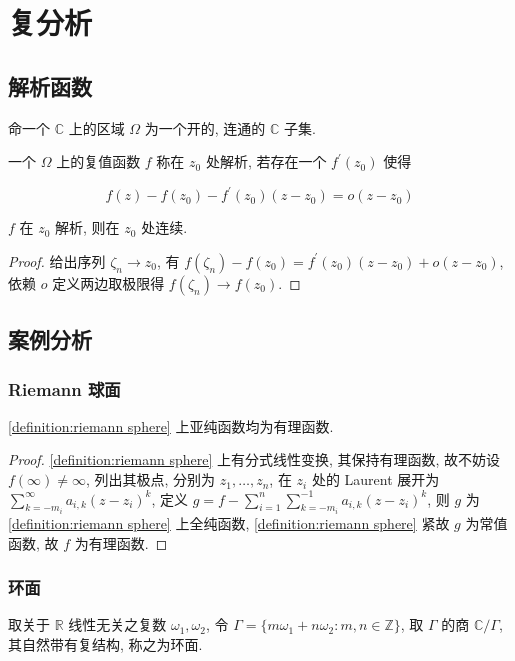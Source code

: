 \section{复分析}

\subsection{解析函数}

\begin{definition}[区域]
    命一个 \(\mathbb{C}\) 上的区域 \(\Omega\) 为一个开的, 连通的 \(\mathbb{C}\) 子集.
\end{definition}

\begin{definition}[解析]
    一个 \(\Omega\) 上的复值函数 \(f\) 称在 \(z_0\) 处解析, 若存在一个 \(f^\prime(z_0)\) 使得

    \[
        f(z) - f(z_0) - f^\prime(z_0)(z - z_0) = o(z - z_0)
    \]
\end{definition}

\begin{lemma}
    \(f\) 在 \(z_0\) 解析, 则在 \(z_0\) 处连续.

    \begin{proof}
        给出序列 \(\zeta_n \to z_0\), 有 \(f(\zeta_n) - f(z_0) = f^\prime(z_0)(z - z_0) + o(z - z_0)\), 
        依赖 \(o\) 定义两边取极限得 \(f(\zeta_n) \to f(z_0)\).
    \end{proof}
\end{lemma}

\begin{definition}[Riemann 球面]
    \label {definition:riemann sphere}
\end{definition}

\subsection{案例分析}

\subsubsection{Riemann 球面}

\begin{lemma}
    \ref{definition:riemann sphere} 上亚纯函数均为有理函数.

    \begin{proof}
        \ref{definition:riemann sphere} 上有分式线性变换, 其保持有理函数, 故不妨设 \(f(\infty) \neq \infty\),
        列出其极点, 分别为 \(z_1,\ldots,z_n\), 在 \(z_i\) 处的 Laurent 展开为 \(\sum_{k = -m_i}^\infty a_{i,k} (z - z_i)^k\),
        定义 \(g = f - \sum_{i = 1}^n \sum_{k = -m_i}^{-1} a_{i,k} (z - z_i)^k\), 则 \(g\) 为 \ref{definition:riemann sphere} 上全纯函数,
        \ref{definition:riemann sphere} 紧故 \(g\) 为常值函数, 故 \(f\) 为有理函数.
    \end{proof}
\end{lemma}

\subsubsection{环面}

\begin{definition}[环面]
    \label {definition:torus}
    取关于 \(\mathbb{R}\) 线性无关之复数 \(\omega_1,\omega_2\), 令 \(\Gamma = \{m \omega_1 + n \omega_2 : m,n \in \mathbb{Z}\}\),
    取 \(\Gamma\) 的商 \(\mathbb{C} / \Gamma\), 其自然带有复结构, 称之为环面.
\end{definition}
